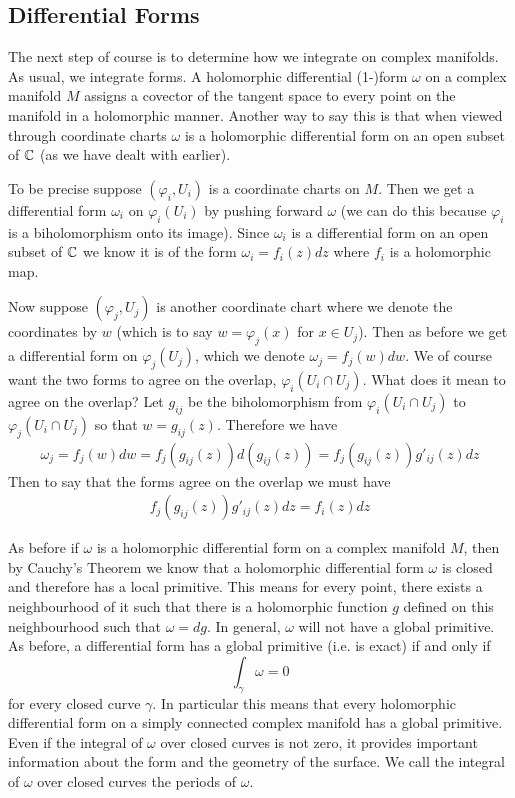 \subsection{Differential Forms}
The next step of course is to determine how we integrate on complex manifolds. As usual, we integrate forms. A holomorphic differential (1-)form $\omega$ on a complex manifold $M$ assigns a covector of the tangent space to every point on the manifold in a holomorphic manner. Another way to say this is that when viewed through coordinate charts $\omega$ is a holomorphic differential form on an open subset of $\mathbb{C}$ (as we have dealt with earlier). 

To be precise suppose $(\varphi_i, U_i)$ is a coordinate charts on $M$. Then we get a differential form $\omega_i$ on $\varphi_i(U_i)$ by pushing forward $\omega$ (we can do this because $\varphi_i$ is a biholomorphism onto its image). Since $\omega_i$ is a differential form on an open subset of $\mathbb{C}$ we know it is of the form $\omega_i = f_i(z) dz$ where $f_i$ is a holomorphic map. 

Now suppose $(\varphi_j, U_j)$ is another coordinate chart where we denote the coordinates by $w$ (which is to say $w = \varphi_j(x)$ for $x \in U_j$). Then as before we get a differential form on $\varphi_j(U_j)$, which we denote $\omega_j = f_j(w) dw$. We of course want the two forms to agree on the overlap, $\varphi_i(U_i \cap U_j)$. What does it mean to agree on the overlap? Let $g_{ij}$ be the biholomorphism from $\varphi_i(U_i \cap U_j)$ to $\varphi_j(U_i \cap U_j)$ so that $w = g_{ij}(z)$. Therefore we have 
\begin{align*}
    \omega_j = f_j(w)dw = f_j(g_{ij}(z)) d(g_{ij}(z)) = f_{j}(g_{ij}(z)) g'_{ij}(z) dz
\end{align*} 
Then to say that the forms agree on the overlap we must have 
\begin{align*}
    f_{j}(g_{ij}(z)) g'_{ij}(z) dz = f_i(z) dz
\end{align*}

As before if $\omega$ is a holomorphic differential form on a complex manifold $M$, then by Cauchy's Theorem we know that a holomorphic differential form $\omega$ is closed and therefore has a local primitive. This means for every point, there exists a neighbourhood of it such that there is a holomorphic function $g$ defined on this neighbourhood such that $\omega = dg$. In general, $\omega$ will not have a global primitive. As before, a differential form has a global primitive (i.e. is exact) if and only if 
$$\int_\gamma \omega = 0$$
for every closed curve $\gamma$. In particular this means that every holomorphic differential form on a simply connected complex manifold has a global primitive. Even if the integral of $\omega$ over closed curves is not zero, it provides important information about the form and the geometry of the surface. We call the integral of $\omega$ over closed curves the periods of $\omega$.

